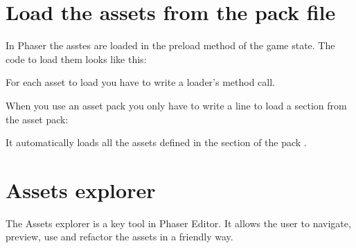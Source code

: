 \documentclass[letterpaper,10pt,english]{sphinxmanual}
\begin{document}
\section{Load the assets from the pack file}
\label{\detokenize{assets_manager:load-the-assets-from-the-pack-file}}
In Phaser the asstes are loaded in the preload method of the game state. The code to load them looks like this:

\begin{sphinxVerbatim}[commandchars=\\\{\}]
 
 
   
 
\end{sphinxVerbatim}

For each asset to load you have to write a loader’s method call.

When you use an asset pack you only have to write a line to load a section from the asset pack:

\begin{sphinxVerbatim}[commandchars=\\\{\}]
 
\end{sphinxVerbatim}

It automatically loads all the assets defined in the  section of the pack .


\section{Assets explorer}
\label{\detokenize{assets_manager:assets-explorer}}
The Assets explorer is a key tool in Phaser Editor. It allows the user to navigate, preview, use and refactor the assets in a friendly way.
\end{document}
